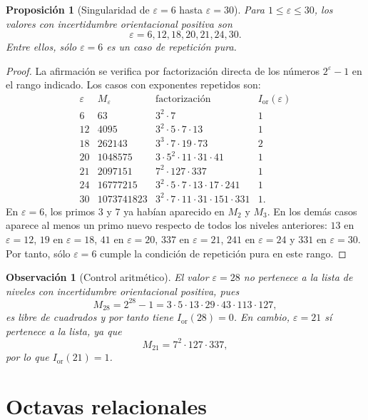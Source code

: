 \documentclass[11pt]{article}
\newtheorem{proposicion}{Proposición}
\newtheorem{observacion}{Observación}
\newcommand{\Ior}{I_{\mathrm{or}}}
\begin{document}
\begin{proposicion}[Singularidad de $\varepsilon=6$ hasta $\varepsilon=30$]\label{prop:eps6}
Para $1\leq\varepsilon\leq30$, los valores con incertidumbre orientacional positiva son
\[
\varepsilon=6,12,18,20,21,24,30.
\]
Entre ellos, sólo $\varepsilon=6$ es un caso de repetición pura.
\end{proposicion}

\begin{proof}
La afirmación se verifica por factorización directa de los números $2^\varepsilon-1$ en el rango indicado. Los casos con exponentes repetidos son:
\[
\begin{array}{cclc}
\varepsilon & M_\varepsilon & \text{factorización} & \Ior(\varepsilon)\\
\hline
6  & 63        & 3^2\cdot7 & 1\\
12 & 4095      & 3^2\cdot5\cdot7\cdot13 & 1\\
18 & 262143    & 3^3\cdot7\cdot19\cdot73 & 2\\
20 & 1048575   & 3\cdot5^2\cdot11\cdot31\cdot41 & 1\\
21 & 2097151   & 7^2\cdot127\cdot337 & 1\\
24 & 16777215  & 3^2\cdot5\cdot7\cdot13\cdot17\cdot241 & 1\\
30 & 1073741823& 3^2\cdot7\cdot11\cdot31\cdot151\cdot331 & 1.
\end{array}
\]
En $\varepsilon=6$, los primos $3$ y $7$ ya habían aparecido en $M_2$ y $M_3$. En los demás casos aparece al menos un primo nuevo respecto de todos los niveles anteriores: $13$ en $\varepsilon=12$, $19$ en $\varepsilon=18$, $41$ en $\varepsilon=20$, $337$ en $\varepsilon=21$, $241$ en $\varepsilon=24$ y $331$ en $\varepsilon=30$. Por tanto, sólo $\varepsilon=6$ cumple la condición de repetición pura en este rango.
\end{proof}

\begin{observacion}[Control aritmético]
El valor $\varepsilon=28$ no pertenece a la lista de niveles con incertidumbre orientacional positiva, pues
\[
M_{28}=2^{28}-1
=3\cdot5\cdot13\cdot29\cdot43\cdot113\cdot127,
\]
es libre de cuadrados y por tanto tiene $\Ior(28)=0$. En cambio, $\varepsilon=21$ sí pertenece a la lista, ya que
\[
M_{21}=7^2\cdot127\cdot337,
\]
por lo que $\Ior(21)=1$.
\end{observacion}

\clearpage
\section{Octavas relacionales}
\end{document}
